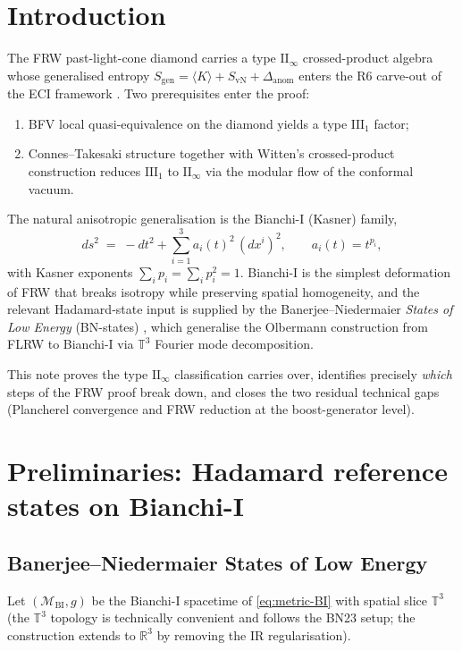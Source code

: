 \documentclass[11pt,a4paper]{article}
\theoremstyle{definition}
\newcommand{\R}{\mathbb{R}}
\newcommand{\T}{\mathbb{T}}
\newcommand{\cM}{\mathcal{M}}
\newcommand{\BI}{\mathrm{BI}}
\begin{document}
\section{Introduction}

The FRW past-light-cone diamond carries a type $\mathrm{II}_\infty$
crossed-product algebra whose generalised entropy $S_\mathrm{gen}=\langle K\rangle
+S_\mathrm{vN}+\Delta_\mathrm{anom}$ enters the R6 carve-out of the ECI
framework \cite{ECI-FRW-note}. Two prerequisites enter the proof:
\begin{enumerate}\setlength\itemsep{2pt}
\item BFV local quasi-equivalence \cite{BFV03} on the diamond yields a
type $\mathrm{III}_1$ factor;
\item Connes--Takesaki structure \cite{Connes73} together with Witten's
crossed-product construction \cite{Witten2022} reduces $\mathrm{III}_1$ to
$\mathrm{II}_\infty$ via the modular flow of the conformal vacuum.
\end{enumerate}

The natural anisotropic generalisation is the Bianchi-I (Kasner) family,
\begin{equation}\label{eq:metric-BI}
ds^2 \;=\; -dt^2 + \sum_{i=1}^{3} a_i(t)^2\,(dx^i)^2 ,
\qquad a_i(t) = t^{p_i},
\end{equation}
with Kasner exponents $\sum_i p_i = \sum_i p_i^2 = 1$. Bianchi-I is the
simplest deformation of FRW that breaks isotropy while preserving spatial
homogeneity, and the relevant Hadamard-state input is supplied by the
Banerjee--Niedermaier \emph{States of Low Energy} (BN-states)
\cite{BN23,Olbermann07}, which generalise the Olbermann construction
\cite{Olbermann07} from FLRW to Bianchi-I via $\T^3$ Fourier mode
decomposition.

This note proves the type $\mathrm{II}_\infty$ classification carries over,
identifies precisely \emph{which} steps of the FRW proof break down, and
closes the two residual technical gaps (Plancherel convergence and FRW
reduction at the boost-generator level).

\section{Preliminaries: Hadamard reference states on Bianchi-I}\label{sec:prelim}

\subsection{Banerjee--Niedermaier States of Low Energy}
Let $(\cM_\BI,g)$ be the Bianchi-I spacetime of \eqref{eq:metric-BI} with
spatial slice $\T^3$ (the $\T^3$ topology is technically convenient and
follows the BN23 setup; the construction extends to $\R^3$ by removing
the IR regularisation).
\end{document}
